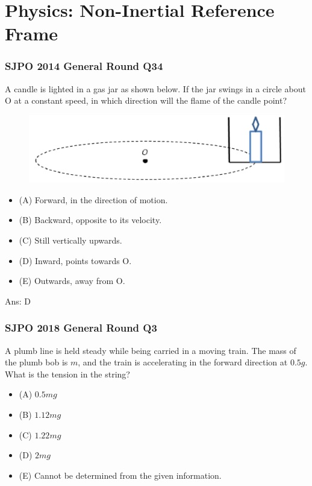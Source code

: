 \documentclass{article}
\begin{document}
\section{Physics: Non-Inertial Reference Frame}

\subsubsection{SJPO 2014 General Round Q34}
A candle is lighted in a gas jar as shown below. If the jar swings in a circle about O at a constant speed, in which direction will the flame of the candle point?
\begin{figure}
\includegraphics[width=1.0\linewidth]{images/sjpo2014q34.png}
\end{figure}
\begin{itemize}
\item[] (A) Forward, in the direction of motion.
\item[] (B) Backward, opposite to its velocity.
\item[] (C) Still vertically upwards.
\item[] (D) Inward, points towards $\mathrm{O}$.
\item[] (E) Outwards, away from O.
\end{itemize}
Ans: \ifpaper D \fi

\subsubsection{SJPO 2018 General Round Q3}
A plumb line is held steady while being carried in a moving train. The mass of the plumb bob is $m$, and the train is accelerating in the forward direction at $0.5 g$. What is the tension in the string?
\begin{itemize}
\item[] (A) $0.5 mg$
\item[] (B) $1.12 mg$
\item[] (C) $1.22 mg$
\item[] (D) $2 mg$
\item[] (E) Cannot be determined from the given information.
\end{itemize}
\end{document}
